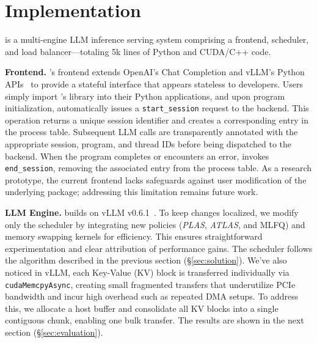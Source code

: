 \section{Implementation}
\label{sec:implementation}
\text{\name} is a multi-engine LLM inference serving system comprising a frontend, scheduler, and load balancer—totaling 5k lines of Python and CUDA/C++ code.

\vspace{1mm}
\noindent \textbf{Frontend.} \text{\name}’s frontend extends OpenAI’s Chat Completion and vLLM’s Python APIs~\cite{vllm, chat_completions} to provide a stateful interface that appears stateless to developers. Users simply import \text{\name}’s library into their Python applications, and upon program initialization, \text{\name} automatically issues a \texttt{start\_session} request to the backend. This operation returns a unique session identifier and creates a corresponding entry in the process table. Subsequent LLM calls are transparently annotated with the appropriate session, program, and thread IDs before being dispatched to the backend. When the program completes or encounters an error, \text{\name} invokes \texttt{end\_session}, removing the associated entry from the process table. As a research prototype, the current frontend lacks safeguards against user modification of the underlying package; addressing this limitation remains future work.


\vspace{1mm}
\noindent \textbf{LLM Engine.} 
\text{\name} builds on vLLM v0.6.1~\cite{vllm}. To keep changes localized, we modify only the scheduler by integrating new policies (\textit{PLAS}, \textit{ATLAS}, and MLFQ) and memory swapping kernels for efficiency. This ensures straightforward experimentation and clear attribution of performance gains. The scheduler follows the algorithm described in the previous section (\S\ref{sec:solution}). We've also noticed in vLLM, each Key-Value (KV) block is transferred individually via \texttt{cudaMemcpyAsync}, creating small fragmented transfers that underutilize PCIe bandwidth and incur high overhead such as repeated DMA setups. To address this, we allocate a host buffer and consolidate all KV blocks into a single contiguous chunk, enabling one bulk transfer. The results are shown in the next section (\S\ref{sec:evaluation}).


